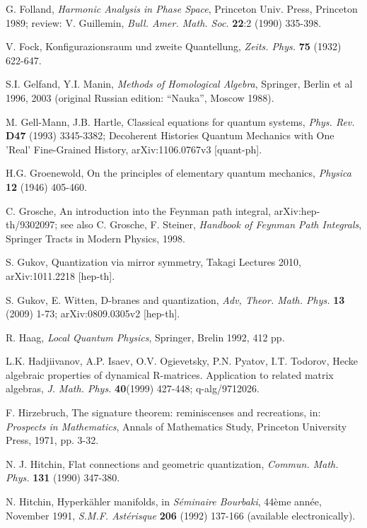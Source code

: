 \begin{thebibliography}{000}
 G. Folland, {\it Harmonic Analysis in Phase Space}, Princeton Univ. Press, Princeton 1989;
review: V. Guillemin, {\it Bull. Amer. Math. Soc.} {\bf 22}:2 (1990) 335-398.

 V. Fock, Konfigurazionsraum und zweite Quantellung, {\it
Zeits. Phys.} {\bf 75} (1932) 622-647.

 S.I. Gelfand, Y.I. Manin, {\it Methods of Homological Algebra}, Springer,
Berlin et al 1996, 2003 (original Russian edition: ``Nauka'', Moscow 1988).

 M. Gell-Mann, J.B. Hartle, Classical equations for quantum systems, {\it Phys. Rev.} 
{\bf D47} (1993) 3345-3382; Decoherent Histories Quantum Mechanics with One 'Real' Fine-Grained History,
 arXiv:1106.0767v3 [quant-ph].

 H.G. Groenewold, On the principles of elementary quantum mechanics,
{\it Physica} {\bf 12} (1946) 405-460.

 C. Grosche, An introduction into the Feynman path integral, arXiv:hep-th/9302097;
see also C. Grosche, F. Steiner, {\it Handbook of Feynman Path Integrals}, Springer Tracts in Modern Physics, 1998.

 S. Gukov, Quantization via mirror symmetry, Takagi
Lectures 2010, arXiv:1011.2218 [hep-th].

 S. Gukov, E. Witten, D-branes and quantization, {\it
Adv, Theor. Math. Phys.} {\bf 13} (2009) 1-73; arXiv:0809.0305v2 [hep-th].

 R. Haag, {\it Local Quantum Physics}, Springer, Brelin 1992,
412 pp.

 L.K. Hadjiivanov, A.P. Isaev, O.V. Ogievetsky, P.N.
Pyatov, I.T. Todorov, Hecke algebraic properties of dynamical R-matrices. 
Application to related matrix algebras, {\it J. Math. Phys.} {\bf 40}(1999) 
427-448; q-alg/9712026.

 F. Hirzebruch, The signature theorem: reminiscenses and
recreations, in: {\it Prospects in Mathematics}, Annals of Mathematics Study,
Princeton University Press, 1971, pp. 3-32.

 N. J. Hitchin, Flat connections and geometric quantization,
{\it Commun. Math. Phys.} {\bf 131} (1990) 347-380.

 N. Hitchin, Hyperk\"ahler manifolds, in {\it S\'eminaire
Bourbaki}, 44\`eme ann\'ee, November 1991, {\it S.M.F. Ast\'erisque} {\bf 206}
(1992) 137-166 (available electronically).
 

\end{thebibliography}
